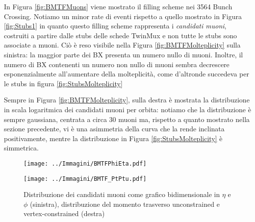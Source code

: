 In Figura \ref{fig:BMTFMuons} viene mostrato il filling scheme nei 3564 Bunch Crossing. Notiamo un minor rate di eventi rispetto a quello mostrato in Figura \ref{fig:Stubs1} in quanto questo filling scheme rappresenta i \textit{candidati muoni}, costruiti a partire dalle stubs delle schede TwinMux e non tutte le stubs sono associate a muoni. Ciò è reso visibile nella Figura \ref{fig:BMTFMolteplicity} sulla sinistra: la maggior parte dei BX presenta un numero nullo di muoni. Inoltre, il numero di BX contenenti un numero non nullo di muoni sembra decrescere esponenzialmente all’aumentare della molteplicità, come d'altronde succedeva per le stubs in figura \ref{fig:StubsMolteplicity}

Sempre in Figura \ref{fig:BMTFMolteplicity}, sulla destra è mostrata la distribuzione in scala logaritmica dei candidati muoni per orbita: notiamo che la distribuzione è sempre gaussiana, centrata a circa 30 muoni ma, rispetto a quanto mostrato nella sezione precedente, vi è una asimmetria della curva che la rende inclinata positivamente, mentre la distribuzione in Figura \ref{fig:StubsMolteplicity} è simmetrica.

\begin{figure}[t]
  \centering
  \begin{minipage}[b]{0.51\textwidth}
    \centering
    \texttt{[image: ../Immagini/BMTFPhiEta.pdf]} 
    \end{minipage}
    \hfill 
    \begin{minipage}[b]{0.48\textwidth}
      \centering
      \texttt{[image: ../Immagini/BMTF\_PtPtu.pdf]} 
    \end{minipage}
    \caption{Distribuzione dei candidati muoni come grafico bidimensionale in $\eta$ e $\phi$ (sinistra), distribuzione del momento trasverso unconstrained e vertex-constrained (destra)}
  \label{fig:BMTFPt}
\end{figure}

